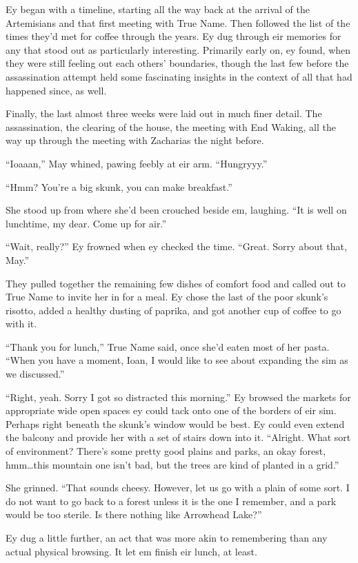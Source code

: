Ey began with a timeline, starting all the way back at the arrival of the Artemisians and that first meeting with True Name. Then followed the list of the times they'd met for coffee through the years. Ey dug through eir memories for any that stood out as particularly interesting. Primarily early on, ey found, when they were still feeling out each others' boundaries, though the last few before the assassination attempt held some fascinating insights in the context of all that had happened since, as well.

Finally, the last almost three weeks were laid out in much finer detail. The assassination, the clearing of the house, the meeting with End Waking, all the way up through the meeting with Zacharias the night before.

``Ioaaan,'' May whined, pawing feebly at eir arm. ``Hungryyy.''

``Hmm? You're a big skunk, you can make breakfast.''

She stood up from where she'd been crouched beside em, laughing. ``It is well on lunchtime, my dear. Come up for air.''

``Wait, really?'' Ey frowned when ey checked the time. ``Great. Sorry about that, May.''

They pulled together the remaining few dishes of comfort food and called out to True Name to invite her in for a meal. Ey chose the last of the poor skunk's risotto, added a healthy dusting of paprika, and got another cup of coffee to go with it.

``Thank you for lunch,'' True Name said, once she'd eaten most of her pasta. ``When you have a moment, Ioan, I would like to see about expanding the sim as we discussed.''

``Right, yeah. Sorry I got so distracted this morning.'' Ey browsed the markets for appropriate wide open spaces ey could tack onto one of the borders of eir sim. Perhaps right beneath the skunk's window would be best. Ey could even extend the balcony and provide her with a set of stairs down into it. ``Alright. What sort of environment? There's some pretty good plains and parks, an okay forest, hmm\ldots this mountain one isn't bad, but the trees are kind of planted in a grid.''

She grinned. ``That sounds cheesy. However, let us go with a plain of some sort. I do not want to go back to a forest unless it is the one I remember, and a park would be too sterile. Is there nothing like Arrowhead Lake?''

Ey dug a little further, an act that was more akin to remembering than any actual physical browsing. It let em finish eir lunch, at least.

